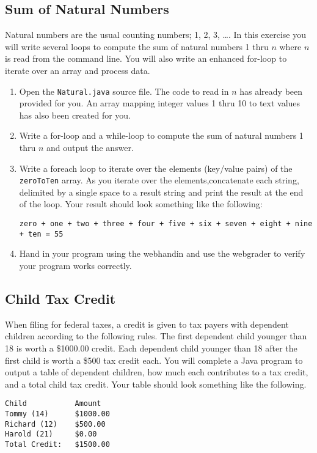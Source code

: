 \documentclass[12pt]{scrartcl}
\begin{document}
\subsection*{Sum of Natural Numbers}

Natural numbers are the usual counting numbers; 1, 2, 3, \ldots.  In 
this exercise you will write several loops to compute the sum of 
natural numbers 1 thru $n$ where $n$ is read from the command line.  
You will also write an enhanced for-loop to iterate over an array and 
process data.

\begin{enumerate}
  \item Open the \texttt{Natural.java} source file.  The code 
	to read in $n$ has already been provided for you.  An array mapping 
	integer values 1 thru 10 to text values has also been created for you.
  \item Write a for-loop and a while-loop to compute the sum of natural 
  	numbers 1 thru $n$ and output the answer.
  \item Write a foreach loop to iterate over the elements (key/value pairs) 
	of the \texttt{zeroToTen} array.  As you iterate over the 
	elements,concatenate each string, delimited by a single space to a 
	result string and print the result at the end of the loop.  Your 
	result should look something like the following:
	
	\texttt{zero + one + two + three + four + five + six + seven + eight + nine + ten = 55}
  \item Hand in your program using the webhandin and use the webgrader
    to verify your program works correctly.
\end{enumerate}

\subsection*{Child Tax Credit}

When filing for federal taxes, a credit is given to tax payers 
with dependent children according to the following rules.  The 
first dependent child younger than 18 is worth a \$1000.00 credit.  
Each dependent child younger than 18 after the first child is 
worth a \$500 tax credit each.  You will complete a Java program
to output a table of dependent children, how much each contributes 
to a tax credit, and a total child tax credit.  Your table should 
look something like the following.

\begin{verbatim}
Child           Amount
Tommy (14)      $1000.00
Richard (12)    $500.00
Harold (21)     $0.00
Total Credit:   $1500.00
\end{verbatim}
\end{document}
